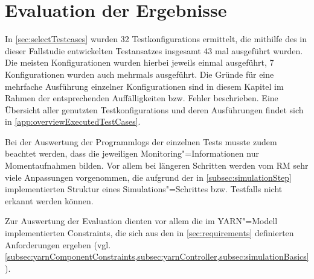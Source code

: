 \chapter{Evaluation der Ergebnisse}
\label{ch:evaluationResults}

In \cref{sec:selectTestcases} wurden 32 \glspl{Testkonfiguration} ermittelt, die mithilfe des in dieser Fallstudie entwickelten Testansatzes insgesamt 43 mal ausgeführt wurden.
Die meisten Konfigurationen wurden hierbei jeweils einmal ausgeführt, 7 Konfigurationen wurden auch mehrmals ausgeführt.
Die Gründe für eine mehrfache Ausführung einzelner Konfigurationen sind in diesem Kapitel im Rahmen der entsprechenden Auffälligkeiten bzw. Fehler beschrieben.
Eine Übersicht aller genutzten \glspl{Testkonfiguration} und deren Ausführungen findet sich in \cref{app:overviewExecutedTestCases}.

Bei der Auswertung der Programmlogs der einzelnen \glspl{Test} musste zudem beachtet werden, dass die jeweiligen Monitoring"=Informationen nur Momentaufnahmen bilden.
Vor allem bei längeren Schritten werden vom \gls{RM} sehr viele Anpassungen vorgenommen, die aufgrund der in \cref{subsec:simulationStep} implementierten Struktur eines Simulations"=Schrittes bzw. Testfalls nicht erkannt werden können.

Zur Auswertung der Evaluation dienten vor allem die im \gls{YARN}"=Modell implementierten Constraints, die sich aus den in \cref{sec:requirements} definierten Anforderungen ergeben (vgl. \cref{subsec:yarnComponentConstraints,subsec:yarnController,subsec:simulationBasics}).
















